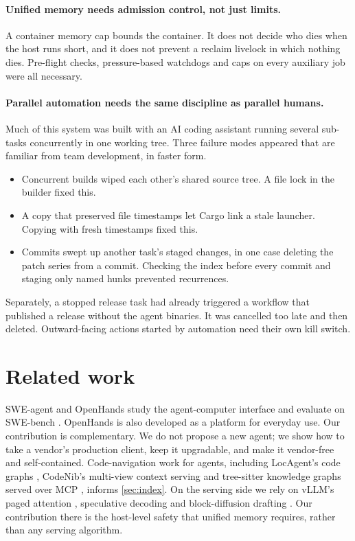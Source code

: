 \documentclass[11pt]{article}
\begin{document}
\paragraph{Unified memory needs admission control, not just limits.} A container memory cap bounds
the container. It does not decide who dies when the host runs short, and it does not prevent a
reclaim livelock in which nothing dies. Pre-flight checks, pressure-based watchdogs and caps on
every auxiliary job were all necessary.

\paragraph{Parallel automation needs the same discipline as parallel humans.} Much of this system
was built with an AI coding assistant running several sub-tasks concurrently in one working tree.
Three failure modes appeared that are familiar from team development, in faster form.
\begin{itemize}
  \item Concurrent builds wiped each other's shared source tree. A file lock in the builder fixed
    this.
  \item A copy that preserved file timestamps let Cargo link a stale launcher. Copying with fresh
    timestamps fixed this.
  \item Commits swept up another task's staged changes, in one case deleting the patch series from
    a commit. Checking the index before every commit and staging only named hunks prevented
    recurrences.
\end{itemize}
Separately, a stopped release task had already triggered a workflow that published a release
without the agent binaries. It was cancelled too late and then deleted. Outward-facing actions
started by automation need their own kill switch.

\section{Related work}

SWE-agent \cite{yang2024sweagent} and OpenHands \cite{wang2024openhands} study the
agent-computer interface and evaluate on SWE-bench \cite{jimenez2024swebench}. OpenHands is also
developed as a platform for everyday use. Our contribution is complementary. We do not
propose a new agent; we show how to take a vendor's production client, keep it upgradable, and make
it vendor-free and self-contained. Code-navigation work for agents, including
LocAgent's code graphs \cite{chen2025locagent}, CodeNib's multi-view context serving
\cite{yu2026codenib} and tree-sitter knowledge graphs served over MCP \cite{vogel2026codebasememory},
informs \cref{sec:index}. On the serving side we rely on vLLM's paged attention \cite{kwon2023vllm},
speculative decoding \cite{leviathan2023speculative} and block-diffusion drafting
\cite{chen2026dflash}. Our contribution there is the host-level safety that unified memory requires,
rather than any serving algorithm.
\end{document}
